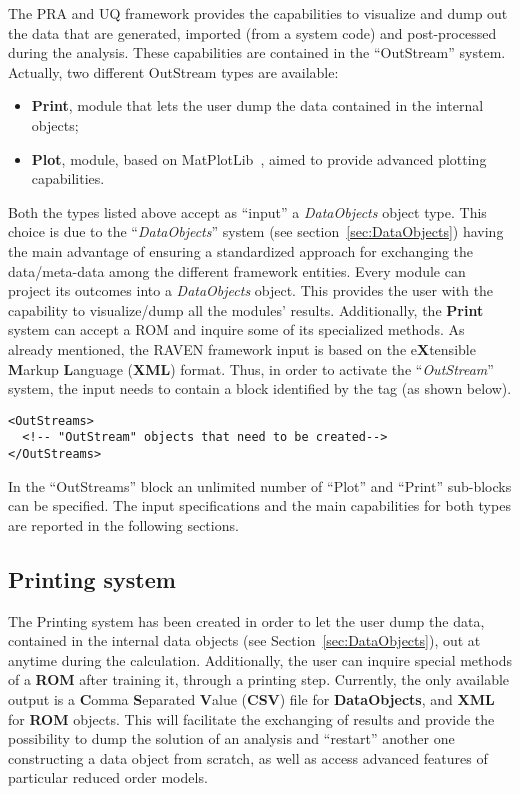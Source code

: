 The PRA and UQ framework provides the capabilities to visualize and dump out the
data that are generated, imported (from a system code) and post-processed during
the analysis.
%
These capabilities are contained in the ``OutStream'' system.
%
Actually, two different OutStream types are available:
\vspace{-5mm}
\begin{itemize}
  \itemsep0em
  \item \textbf{Print}, module that lets the user dump the data contained in the
  internal objects;
  \item \textbf{Plot}, module, based on MatPlotLib~\cite{MatPlotLib}, aimed to
  provide advanced plotting capabilities.
\end{itemize}
\vspace{-5mm}
Both the types listed above accept as ``input'' a \textit{DataObjects} object
type.
%
This choice is due to the ``\textit{DataObjects}'' system (see
section~\ref{sec:DataObjects}) having the main advantage of ensuring a standardized
approach for exchanging the data/meta-data among the different framework
entities.
%
Every module can project its outcomes into a \textit{DataObjects} object.
%
This provides the user with the capability to visualize/dump all the modules'
results.
%
Additionally, the \textbf{Print} system can accept a ROM and inquire some of its
specialized methods.
%
As already mentioned, the RAVEN
framework input is based on the e\textbf{X}tensible \textbf{M}arkup
\textbf{L}anguage (\textbf{XML}) format.
%
Thus, in order to activate the ``\textit{OutStream}'' system, the input needs to
contain a block identified by the  tag (as shown
below).

\begin{lstlisting}[style=XML]
<OutStreams>
  <!-- "OutStream" objects that need to be created-->
</OutStreams>
\end{lstlisting}

In the ``OutStreams'' block an unlimited number of ``Plot'' and ``Print''
sub-blocks can be specified.
%
The input specifications and the main capabilities for both types are reported
in the following sections.
%
%
\subsection{Printing system \label{sec:printing}}
The Printing system has been created in order to let the user dump the data,
contained in the internal data objects (see Section~\ref{sec:DataObjects}), out
at anytime during the calculation.
%
Additionally, the user can inquire special methods of a \textbf{ROM} after training it,
through a printing step.
%
Currently, the only available output is a \textbf{C}omma \textbf{S}eparated
\textbf{V}alue (\textbf{CSV}) file for \textbf{DataObjects}, and \textbf{XML}
for \textbf{ROM} objects.
%
%
This will facilitate the exchanging of results and provide the possibility to
dump the solution of an analysis and ``restart'' another one constructing a
data object from scratch, as well as access advanced features of particular
reduced order models.
%
